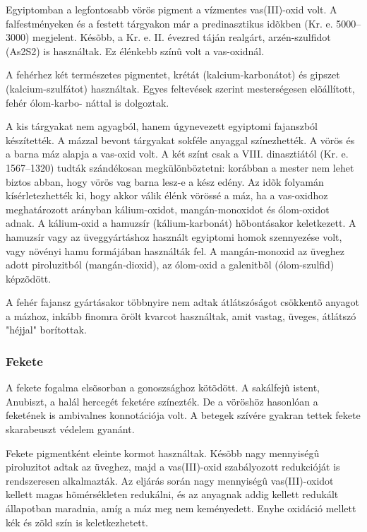 	Egyiptomban a legfontosabb vörös pigment a vízmentes vas(III)-oxid volt. A falfestményeken és a festett tárgyakon már a predinasztikus idõkben (Kr. e. 5000–3000) megjelent. Késõbb, a Kr. e. II. évezred táján  realgárt, arzén-szulfidot (As2S2) is használtak. Ez élénkebb színû volt a vas-oxidnál.
	
	A fehérhez két természetes pigmentet, krétát (kalcium-karbonátot) és gipszet (kalcium-szulfátot) használtak. Egyes feltevések szerint mesterségesen elõállított, fehér ólom-karbo- náttal is dolgoztak.
	
	A kis tárgyakat nem agyagból, hanem úgynevezett egyiptomi fajanszból készítették. A mázzal bevont tárgyakat sokféle anyaggal színezhették. A vörös és a barna máz alapja a vas-oxid volt. A két színt csak a VIII. dinasztiától (Kr. e. 1567–1320) tudták szándékosan megkülönböztetni: korábban a mester nem lehet biztos abban, hogy vörös vag barna lesz-e a kész edény. Az idõk folyamán kísérletezhették ki, hogy akkor válik élénk vörössé a máz, ha a vas-oxidhoz meghatározott arányban kálium-oxidot, mangán-monoxidot és ólom-oxidot adnak. A kálium-oxid a hamuzsír (kálium-karbonát) hõbontásakor keletkezett. A hamuzsír vagy az üveggyártáshoz használt egyiptomi homok szennyezése volt, vagy növényi hamu formájában használták fel. A mangán-monoxid az üveghez adott piroluzitból (mangán-dioxid), az ólom-oxid a galenitbõl (ólom-szulfid) képzõdött.
	
	A fehér fajansz gyártásakor többnyire nem adtak átlátszóságot csökkentõ anyagot a mázhoz, inkább finomra õrölt kvarcot használtak, amit vastag, üveges, átlátszó "héjjal" borítottak.
	
	\subsubsection{Fekete}
	
	A fekete fogalma elsõsorban a gonoszsághoz kötõdött. A sakálfejû istent, Anubiszt, a halál hercegét feketére színezték. De a vöröshöz hasonlóan a feketének is ambivalnes konnotációja volt. A betegek szívére gyakran tettek fekete skarabeuszt védelem gyanánt.
	
	Fekete pigmentként eleinte kormot használtak. Késõbb nagy mennyiségû piroluzitot adtak az üveghez, majd a vas(III)-oxid szabályozott redukcióját is rendszeresen alkalmazták. Az eljárás során nagy mennyiségû vas(III)-oxidot kellett magas hõmérsékleten redukálni, és az anyagnak addig kellett redukált állapotban maradnia, amíg a máz meg nem keményedett. Enyhe oxidáció mellett kék és zöld szín is keletkezhetett.
	
